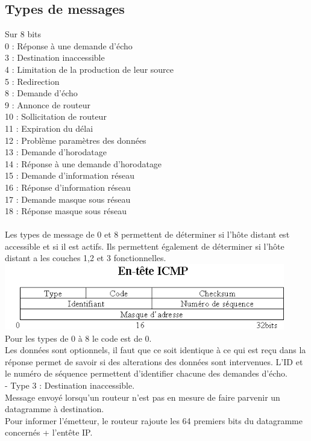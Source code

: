 \documentclass{article}
\begin{document}
\subsection{Types de messages}
Sur 8 bits \\
0 : Réponse à une demande d'écho \\
3 : Destination inaccessible \\
4 : Limitation de la production de leur source \\
5 : Redirection \\
8 : Demande d'écho \\
9 : Annonce de routeur \\
10 : Sollicitation de routeur \\
11 : Expiration du délai \\
12 : Problème paramètres des données \\
13 : Demande d'horodatage \\ 
14 : Réponse à une demande d'horodatage \\
15 : Demande d'information réseau \\
16 : Réponse d'information réseau \\
17 : Demande masque sous réseau \\
18 : Réponse masque sous réseau \\
\\
Les types de message de 0 et 8 permettent de déterminer si l'hôte distant est accessible et si il est actifs. Ils permettent également de déterminer si l'hôte distant a les couches 1,2 et 3 fonctionnelles. 
\\ 
\includegraphics{icmp.png} 
\\
Pour les types de 0 à 8 le code est de 0. \\
Les données sont optionnels, il faut que ce soit identique à ce qui est reçu dans la réponse permet de savoir si des alterations des données sont intervenues. L'ID et le numéro de séquence permettent d'identifier chacune des demandes d'écho. 
\\

- Type 3 : Destination inaccessible. \\
Message envoyé lorsqu'un routeur n'est pas en mesure de faire parvenir un datagramme à destination. \\
Pour informer l'émetteur, le routeur rajoute les 64 premiers bits du datagramme concernés + l'entête IP. \\
\\
\end{document}
